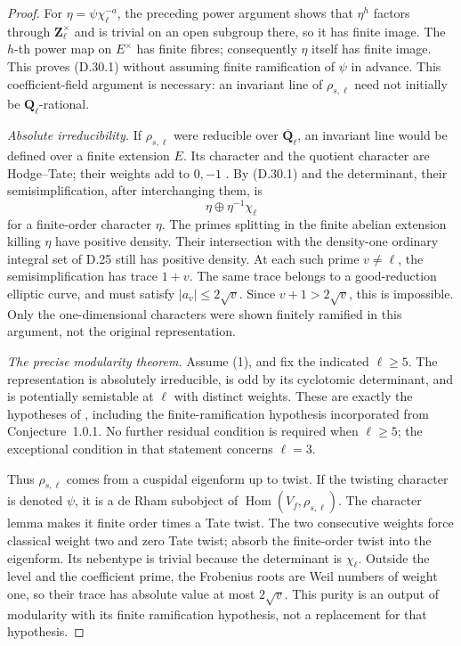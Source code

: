 \begin{proof}
For $\eta=\psi\chi_\ell^{-a}$, the preceding power argument
shows that $\eta^h$ factors through $\mathbf Z_\ell^\times$
and is trivial on an open subgroup there, so it has finite
image. The $h$-th power map on $E^\times$ has finite
fibres; consequently $\eta$ itself has finite image.
This proves \textup{(D.30.1)} without assuming finite
ramification of $\psi$ in advance.
This coefficient-field argument is necessary: an invariant
line of $\rho_{s,\ell}$ need not initially be
$\mathbf Q_\ell$-rational.

\emph{Absolute irreducibility.}
If $\rho_{s,\ell}$ were reducible over
$\overline{\mathbf Q}_\ell$, an invariant line would be
defined over a finite extension $E$.
Its character and the quotient character are Hodge--Tate;
their weights add to $0,-1$
\citep[Proposition~2.4.4]{D_BrinonConrad2009}.
By \textup{(D.30.1)} and the determinant, their
semisimplification, after interchanging them, is
\[
                    \eta\oplus\eta^{-1}\chi_\ell
\]
for a finite-order character $\eta$.
The primes splitting in the finite abelian extension
killing $\eta$ have positive density. Their intersection
with the density-one ordinary integral set of D.25
still has positive density. At each such prime
$v\ne\ell$, the semisimplification has trace $1+v$.
The same trace belongs to a good-reduction elliptic curve,
and must satisfy $|a_v|\le2\sqrt v$. Since
$v+1>2\sqrt v$, this is impossible.
Only the one-dimensional characters were shown finitely
ramified in this argument, not the original representation.

\emph{The precise modularity theorem.}
Assume \textup{(1)}, and fix the indicated $\ell\ge5$.
The representation is absolutely irreducible, is odd by
its cyclotomic determinant, and is potentially semistable
at $\ell$ with distinct weights. These are exactly the
hypotheses of \citet[Theorem~1.0.4]{D_Pan2022}, including
the finite-ramification hypothesis incorporated from
Conjecture~1.0.1. No further residual condition is required
when $\ell\ge5$; the exceptional condition in that statement
concerns $\ell=3$.

Thus $\rho_{s,\ell}$ comes from a cuspidal eigenform up
to twist. If the twisting character is denoted $\psi$,
it is a de Rham subobject of
$\operatorname{Hom}(V_f,\rho_{s,\ell})$.
The character lemma makes it finite order times a Tate
twist. The two consecutive weights force classical weight
two and zero Tate twist; absorb the finite-order twist
into the eigenform. Its nebentype is trivial because
the determinant is $\chi_\ell$.
Outside the level and the coefficient prime, the Frobenius
roots are Weil numbers of weight one, so their trace has
absolute value at most $2\sqrt v$.
This purity is an output of modularity with its finite
ramification hypothesis, not a replacement for that
hypothesis.


\end{proof}
